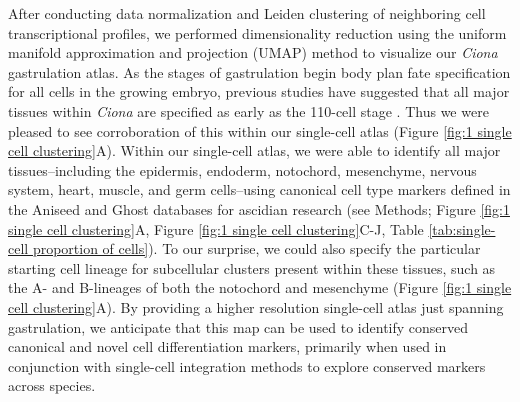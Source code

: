 After conducting data normalization and Leiden clustering of neighboring cell transcriptional profiles, we performed dimensionality reduction using the uniform manifold approximation and projection (UMAP) method to visualize our \textit{Ciona} gastrulation atlas. As the stages of gastrulation begin body plan fate specification for all cells in the growing embryo, previous studies have suggested that all major tissues within \textit{Ciona} are specified as early as the 110-cell stage \cite{satoh2014,cao2019,imai2006,imai2004}. Thus we were pleased to see corroboration of this within our single-cell atlas (Figure \ref{fig:1 single cell clustering}A). Within our single-cell atlas, we were able to identify all major tissues–including the epidermis, endoderm, notochord, mesenchyme, nervous system, heart, muscle, and germ cells–using canonical cell type markers defined in the Aniseed and Ghost databases for ascidian research (see Methods; Figure \ref{fig:1 single cell clustering}A, Figure \ref{fig:1 single cell clustering}C-J, Table \ref{tab:single-cell proportion of cells}). To our surprise, we could also specify the particular starting cell lineage for subcellular clusters present within these tissues, such as the A- and B-lineages of both the notochord and mesenchyme (Figure \ref{fig:1 single cell clustering}A). By providing a higher resolution single-cell atlas just spanning gastrulation, we anticipate that this map can be used to identify conserved canonical and novel cell differentiation markers, primarily when used in conjunction with single-cell integration methods to explore conserved markers across species.

